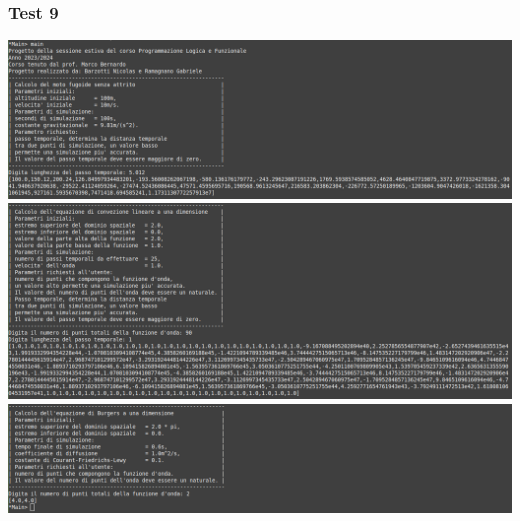 \subsubsection*{Test 9}
\includegraphics[width=\textwidth,height=\textheight,keepaspectratio]{05_testing/image/hs/09_test/01_misto.png}
\\
\includegraphics[width=\textwidth,height=\textheight,keepaspectratio]{05_testing/image/hs/09_test/03_misto.png}
\\
\includegraphics[width=\textwidth,height=\textheight,keepaspectratio]{05_testing/image/hs/09_test/04_misto.png}

